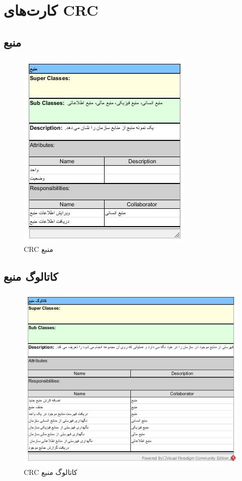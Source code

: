 \chapter{کارت‌های CRC}

\section{منبع}
\begin{figure}[H]
	\centering
	\includegraphics[scale=1]{img/crc/Resource}
	\caption{CRC منبع }
\end{figure}

\section{کاتالوگ منبع}
\begin{figure}[H]
	\centering
	\includegraphics[scale=0.8]{img/crc/ResourceCatalogue}
	\caption{CRC کاتالوگ منبع }
\end{figure}

